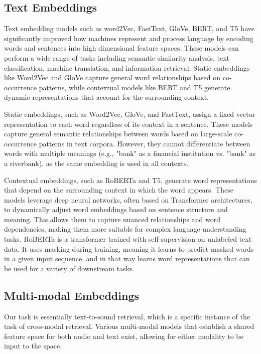 \documentclass[twoside,a4paper]{article}
\begin{document}
\subsection{Text Embeddings}
Text embedding models such as word2Vec, FastText, GloVe, BERT, and T5 have significantly improved how machines represent and process language by encoding words and sentences into high dimensional feature spaces. These models can perform a wide range of tasks including semantic similarity analysis, text classification, machine translation, and information retrieval. Static embeddings like Word2Vec and GloVe capture general word relationships based on co-occurrence patterns, while contextual models like BERT and T5 generate dynamic representations that account for the surrounding context.

Static embeddings, such as Word2Vec, GloVe, and FastText, assign a fixed vector representation to each word regardless of its context in a sentence. These models capture general semantic relationships between words based on large-scale co-occurrence patterns in text corpora. However, they cannot differentiate between words with multiple meanings (e.g., "bank" as a financial institution vs. "bank" as a riverbank), as the same embedding is used in all contexts.

Contextual embeddings, such as RoBERTa and T5, generate word representations that depend on the surrounding context in which the word appears. These models leverage deep neural networks, often based on Transformer architectures, to dynamically adjust word embeddings based on sentence structure and meaning. This allows them to capture nuanced relationships and word dependencies, making them more suitable for complex language understanding tasks. RoBERTa is a transformer trained with self-supervision on unlabeled text data. It uses masking during training, meaning it learns to predict masked words in a given input sequence, and in that way learns word representations that can be used for a variety of downstream tasks.

\subsection{Multi-modal Embeddings}

Our task is essentially text-to-sound retrieval, which is a specific instance of the task of cross-modal retrieval. Various multi-modal models that establish a shared feature space for both audio and text exist, allowing for either modality to be input to the space. 
\end{document}
